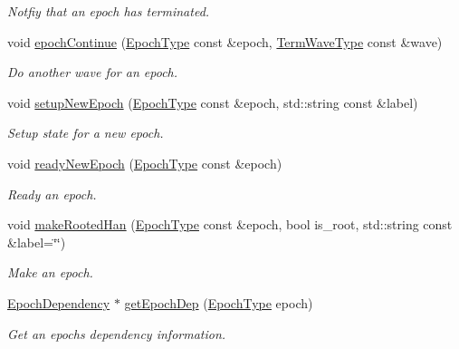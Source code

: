 \begin{DoxyCompactItemize}
\begin{DoxyCompactList}\small\item\em Notfiy that an epoch has terminated. \end{DoxyCompactList}\item 
void \hyperlink{structvt_1_1term_1_1_termination_detector_aa26ade7d870d21b3ec9f5e97154bb847}{epoch\+Continue} (\hyperlink{namespacevt_a985a5adf291c34a3ca263b3378388236}{Epoch\+Type} const \&epoch, \hyperlink{namespacevt_1_1term_a4af17606966b2b5a6cba523bc39095a3}{Term\+Wave\+Type} const \&wave)
\begin{DoxyCompactList}\small\item\em Do another wave for an epoch. \end{DoxyCompactList}\item 
void \hyperlink{structvt_1_1term_1_1_termination_detector_a0522eb82931331906a8be4a3571393b5}{setup\+New\+Epoch} (\hyperlink{namespacevt_a985a5adf291c34a3ca263b3378388236}{Epoch\+Type} const \&epoch, std\+::string const \&label)
\begin{DoxyCompactList}\small\item\em Setup state for a new epoch. \end{DoxyCompactList}\item 
void \hyperlink{structvt_1_1term_1_1_termination_detector_a93d5fd6eead47198c2ed4daaaf68c7ed}{ready\+New\+Epoch} (\hyperlink{namespacevt_a985a5adf291c34a3ca263b3378388236}{Epoch\+Type} const \&epoch)
\begin{DoxyCompactList}\small\item\em Ready an epoch. \end{DoxyCompactList}\item 
void \hyperlink{structvt_1_1term_1_1_termination_detector_ab8ed0e9dd8e865c318c98013a99cd8a1}{make\+Rooted\+Han} (\hyperlink{namespacevt_a985a5adf291c34a3ca263b3378388236}{Epoch\+Type} const \&epoch, bool is\+\_\+root, std\+::string const \&label=\char`\"{}\char`\"{})
\begin{DoxyCompactList}\small\item\em Make an epoch. \end{DoxyCompactList}\item 
\hyperlink{structvt_1_1term_1_1_epoch_dependency}{Epoch\+Dependency} $\ast$ \hyperlink{structvt_1_1term_1_1_termination_detector_a34e823e14dcdd47e32c6eff45c3bf2de}{get\+Epoch\+Dep} (\hyperlink{namespacevt_a985a5adf291c34a3ca263b3378388236}{Epoch\+Type} epoch)
\begin{DoxyCompactList}\small\item\em Get an epoch\textquotesingle{}s dependency information. \end{DoxyCompactList}\item 

\end{DoxyCompactItemize}
